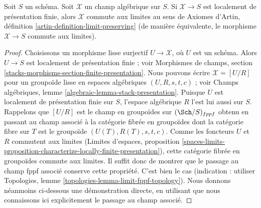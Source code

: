 \begin{lemma}
\label{lemma-locally-finite-presentation-limit-preserving}
Soit $S$ un schéma. Soit $\mathcal{X}$ un champ algébrique sur $S$. Si
$\mathcal{X} \to S$ est localement de présentation finie, alors
$\mathcal{X}$ commute aux limites au sens de Axiomes d'Artin, définition
\ref{artin-definition-limit-preserving} (de manière équivalente, le morphisme
$\mathcal{X} \to S$ commute aux limites).
\end{lemma}

\begin{proof}
Choisissons un morphisme lisse surjectif $U \to \mathcal{X}$, où $U$ est un
schéma. Alors $U \to S$ est localement de présentation finie ; voir Morphismes
de champs, section \ref{stacks-morphisms-section-finite-presentation}. Nous
pouvons écrire $\mathcal{X} = [U/R]$ pour un groupoïde lisse en espaces
algébriques $(U, R, s, t, c)$ ; voir Champs algébriques, lemme
\ref{algebraic-lemma-stack-presentation}. Puisque $U$ est localement de présentation
finie sur $S$, l'espace algébrique $R$ l'est lui aussi sur $S$. Rappelons que
$[U/R]$ est le champ en groupoïdes sur $(\Sch/S)_{fppf}$ obtenu en passant au
champ associé à la catégorie fibrée en groupoïdes dont la catégorie fibre sur
$T$ est le groupoïde $(U(T), R(T), s, t, c)$. Comme les foncteurs $U$ et $R$
commutent aux limites (Limites d'espaces, proposition
\ref{spaces-limits-proposition-characterize-locally-finite-presentation}),
cette catégorie fibrée en groupoïdes commute aux limites. Il suffit donc de
montrer que le passage au champ fppf associé conserve cette propriété. C'est
bien le cas (indication : utiliser Topologies, lemme
\ref{topologies-lemma-limit-fppf-topology}). Nous donnons néanmoins ci-dessous
une démonstration directe, en utilisant que nous connaissons ici explicitement
le passage au champ associé.


\end{proof}
